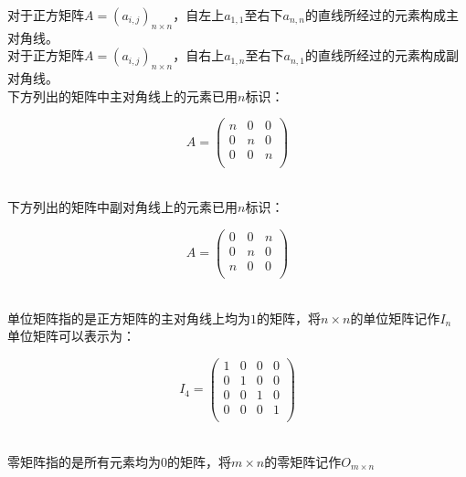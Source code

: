 \documentclass[UTF8]{ctexart}
\begin{document}
    对于正方矩阵$A=(a_{i,j})_{n\times n}$，自左上$a_{1,1}$至右下$a_{n,n}$的直线所经过的元素构成主对角线。\\[3mm]
    对于正方矩阵$A=(a_{i,j})_{n\times n}$，自右上$a_{1,n}$至右下$a_{n,1}$的直线所经过的元素构成副对角线。\\[3mm]
    下方列出的矩阵中主对角线上的元素已用$n$标识：
    \begin{large}
        \begin{equation*}
            A=
            \begin{pmatrix}
                n&0&0\\
                0&n&0\\
                0&0&n\\
            \end{pmatrix}
        \end{equation*}
    \end{large}\\
    下方列出的矩阵中副对角线上的元素已用$n$标识：
    \begin{large}
        \begin{equation*}
            A=
            \begin{pmatrix}
                0&0&n\\
                0&n&0\\
                n&0&0\\
            \end{pmatrix}
        \end{equation*}
    \end{large}\\
    单位矩阵指的是正方矩阵的主对角线上均为$1$的矩阵，将$n\times n$的单位矩阵记作$I_n$\\[3mm]
    单位矩阵可以表示为：
    \begin{large}
        \begin{equation*}
            I_4=
            \begin{pmatrix}
                1&0&0&0\\
                0&1&0&0\\
                0&0&1&0\\
                0&0&0&1\\
            \end{pmatrix}
        \end{equation*}
    \end{large}\\
    零矩阵指的是所有元素均为$0$的矩阵，将$m\times n$的零矩阵记作$O_{m\times n}$\\[3mm]
\end{document}
